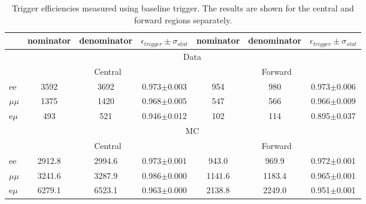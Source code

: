 
\begin{table}[hbp] \caption{Trigger efficiencies measured using \HT baseline trigger. The results are shown for the central and forward regions separately.} 
\centering 
\renewcommand{\arraystretch}{1.2} 
\begin{tabular}{l|c|c|c|c|c|c}     

 & nominator & denominator & $\epsilon_{trigger} \pm \sigma_{stat}$ &  nominator & denominator & $\epsilon_{trigger} \pm \sigma_{stat}$  \\ 
\hline

&\multicolumn{6}{c}{Data} \\
\hline
&  \multicolumn{3}{c|}{Central } & \multicolumn{3}{|c}{ Forward }\\
\hline
ee & 3592 & 3692 & 0.973$\pm$0.003 & 954 & 980 & 0.973$\pm$0.006 \\
$\mu\mu$ & 1375 & 1420 & 0.968$\pm$0.005 & 547 & 566 & 0.966$\pm$0.009 \\
e$\mu$ & 493 & 521 & 0.946$\pm$0.012 & 102 & 114 & 0.895$\pm$0.037 \\
 
 


& \multicolumn{6}{c}{MC} \\
\hline
&  \multicolumn{3}{c|}{Central } & \multicolumn{3}{|c}{ Forward } \\
\hline 
ee & 2912.8 & 2994.6 & 0.973$\pm$0.001 & 943.0 & 969.9 & 0.972$\pm$0.001 \\
$\mu\mu$ & 3241.6 & 3287.9 & 0.986$\pm$0.000 & 1141.6 & 1183.4 & 0.965$\pm$0.001 \\
e$\mu$ & 6279.1 & 6523.1 & 0.963$\pm$0.000 & 2138.8 & 2249.0 & 0.951$\pm$0.001 \\
    
    \hline 
\end{tabular}  
\label{tab:EffValues_Seperated}
\end{table}	
